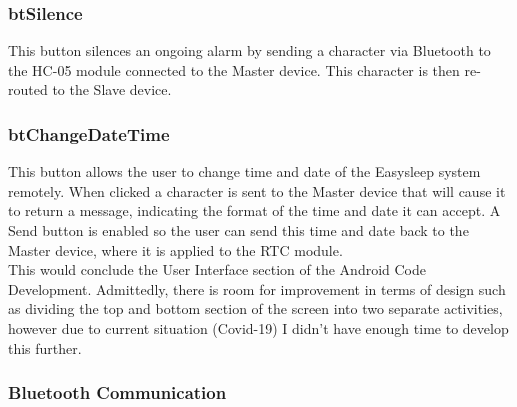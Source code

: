 \documentclass[12pt,a4paper]{article}
\begin{document}
    \subsubsection*{btSilence}
    This button silences an ongoing alarm by sending a character via Bluetooth to the HC-05 module connected to the Master device. This character is then re-routed to the Slave device.
    
    \subsubsection*{btChangeDateTime}
    This button allows the user to change time and date of the Easysleep system remotely. When clicked a character is sent to the Master device that will cause it to return a message, indicating the format of the time and date it can accept. A Send button is enabled so the user can send this time and date back to the Master device, where it is applied to the RTC module. \\
    
    This would conclude the User Interface section of the Android Code Development. Admittedly, there is room for improvement in terms of design such as dividing the top and bottom section of the screen into two separate activities, however due to current situation (Covid-19) I didn't have enough time to develop this further. \\
    
   \subsubsection{Bluetooth Communication}\label{section:btCommunication}
   ~\cite{bib:acceptThread, bib:connectThread, bib:connectedThread, bib:tyingUp, bib:uiLink, bib:androidDev}
   
\end{document}
